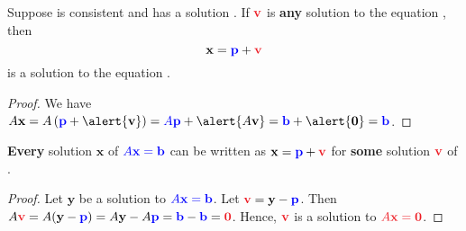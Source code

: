\documentclass[xcolor=dvipsnames,aspectratio=169,t]{beamer}
\begin{document}
\begin{frame}

  \begin{theorem}
    Suppose  is consistent and has a solution .
    If $\colorr{\mbf{v}}$ is \textbf{any} solution to the  equation , then
    \[ \mbf{x} = \colorb{\mbf{p}} + \colorr{\mbf{v}} \]
    is a solution to the  equation .
  \end{theorem}

  \begin{proof}
    \pause
    We have $A \mathbf{x} = A \left( \colorb{ \mbf{p}} + \alert{\mbf{v}} \right) = \colorb{A  \mbf{p}} + \alert{A  \mbf{v}} = \colorb{\mbf{b}} + \alert{\mathbf{0}} = \colorb{\mathbf{b}}$.
  \end{proof}
  
  \pause
  
  \begin{theorem}
    \textbf{Every} solution $\mathbf{x}$ of $\textcolor{blue}{A \mathbf{x} = \mathbf{b}}$ can be written as $\mbf{x} = \colorb{\mbf{p}} + \colorr{\mbf{v}}$ for \textbf{some} solution $\colorr{\mbf{v}}$ of .
  \end{theorem}

  \begin{proof}
    \pause
    Let $\mathbf{y}$ be a solution to $\textcolor{blue}{A \mathbf{x} = \mathbf{b}}$.
    Let $\colorr{\mbf{v}}=\mathbf{y}-\colorb{\mathbf{p}}$.
    Then $A\colorr{\mbf{v}}=A(\mathbf{y}-\colorb{\mathbf{p}}) = A\mathbf{y}-A\colorb{\mathbf{p}}= \colorb{\mathbf{b}}-\colorb{\mathbf{b}}=\colorr{\mathbf{0}}$.
    Hence, $\colorr{\mbf{v}}$ is a solution to $\colorr{A \mathbf{x} = \mathbf{0}}$.
  \end{proof}
  
  \end{frame}

  
\end{document}
